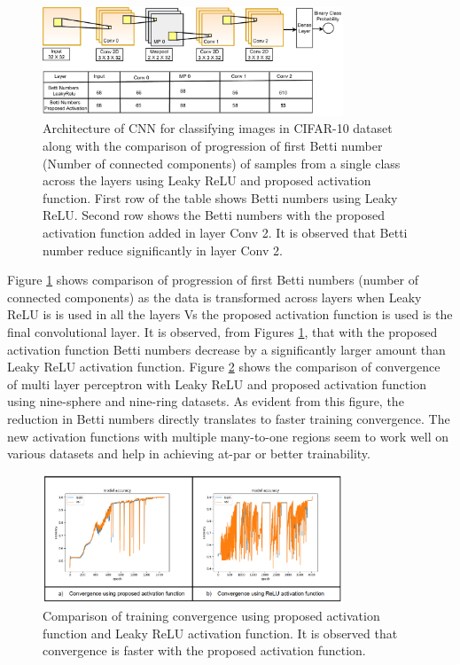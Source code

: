 \documentclass[wcp]{jmlr}
\begin{document}
\begin{figure}[htp]
\begin{center}
\includegraphics[width=0.8\textwidth]{images/cifar_10_arch.drawio}
\caption{Architecture of CNN for classifying images in CIFAR-10 dataset along with the comparison  of progression of first Betti number (Number of connected components) of samples from a single class across the layers using Leaky ReLU  and proposed activation function. First row of the table shows Betti numbers using Leaky ReLU. Second row shows the Betti numbers with the proposed activation function added in layer Conv 2. It is observed that Betti number reduce significantly in layer Conv 2.
}
\label{fig:cifar_10_arch}
\end{center}
\end{figure}


Figure \ref{fig:cifar_10_arch} shows  comparison of progression of first Betti numbers (number of connected components) as the data is transformed across layers when Leaky ReLU is is used in all the layers Vs the proposed activation function is used is the final convolutional layer.  It is observed, from Figures \ref{fig:cifar_10_arch},  that with the proposed activation function Betti numbers decrease  by a significantly larger amount than Leaky ReLU activation function. Figure \ref{fig:training_convergence} shows the comparison of convergence  of multi layer perceptron with Leaky ReLU and proposed activation function using nine-sphere and nine-ring datasets. As evident from this figure, the reduction in Betti numbers  directly translates to faster training convergence. The new activation functions with multiple many-to-one regions seem to work well on various datasets and help in achieving at-par or better trainability.

\begin{figure}[htp]
\begin{center}
\includegraphics[width=0.8\textwidth]{images/training_convergence.png}
\caption{Comparison of training convergence using proposed activation function and Leaky ReLU activation function. It is observed that convergence is faster with the proposed activation function.}
\label{fig:training_convergence}
\end{center}
\end{figure}
\end{document}
